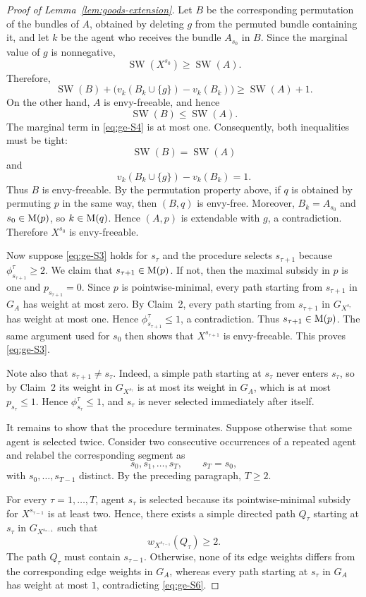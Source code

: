 \begin{proof}[Proof of Lemma~\ref{lem:goods-extension}]
Let $B$ be the corresponding permutation of the bundles of $A$, obtained by
deleting $g$ from the permuted bundle containing it, and let $k$ be the agent who
receives the bundle $A_{s_0}$ in $B$. Since the marginal value of $g$ is
nonnegative,
\[
  \operatorname{SW}(X^{s_0})\geq\operatorname{SW}(A).
\]
Therefore,
\begin{equation}\label{eq:ge-S4}
  \operatorname{SW}(B)
  +
  \bigl(v_k(B_k\cup\{g\})-v_k(B_k)\bigr)
  \geq
  \operatorname{SW}(A)+1.
\end{equation}
On the other hand, $A$ is envy-freeable, and hence
\[
  \operatorname{SW}(B)\leq\operatorname{SW}(A).
\]
The marginal term in \eqref{eq:ge-S4} is at most one. Consequently, both
inequalities must be tight:
\[
  \operatorname{SW}(B)=\operatorname{SW}(A)
\]
and
\[
  v_k(B_k\cup\{g\})-v_k(B_k)=1.
\]
Thus $B$ is envy-freeable. By the permutation property above, if $q$ is obtained
by permuting $p$ in the same way, then $(B,q)$ is envy-free. Moreover,
$B_k=A_{s_0}$ and $s_0\in \mathrm{M}(p)$, so $k\in \mathrm{M}(q)$. Hence $(A,p)$ is
extendable with $g$, a contradiction. Therefore $X^{s_0}$ is envy-freeable.

Now suppose \eqref{eq:ge-S3} holds for $s_\tau$ and the procedure selects
$s_{\tau+1}$ because $\phi^\tau_{s_{\tau+1}}\geq2$. We claim that
$s_{\tau+1}\in \mathrm{M}(p)$. If not, then the maximal subsidy in $p$ is one and
$p_{s_{\tau+1}}=0$. Since $p$ is pointwise-minimal, every path starting from
$s_{\tau+1}$ in $G_A$ has weight at most zero. By Claim~2, every path starting
from $s_{\tau+1}$ in $G_{X^{s_\tau}}$ has weight at most one. Hence
$\phi^\tau_{s_{\tau+1}}\leq1$, a contradiction. Thus $s_{\tau+1}\in \mathrm{M}(p)$.
The same argument used for $s_0$ then shows that $X^{s_{\tau+1}}$ is
envy-freeable. This proves \eqref{eq:ge-S3}.

Note also that $s_{\tau+1}\neq s_\tau$. Indeed, a simple path starting at
$s_\tau$ never enters $s_\tau$, so by Claim~2 its weight in $G_{X^{s_\tau}}$ is at
most its weight in $G_A$, which is at most $p_{s_\tau}\leq1$. Hence
$\phi^\tau_{s_\tau}\leq1$, and $s_\tau$ is never selected immediately after
itself.

It remains to show that the procedure terminates. Suppose otherwise that some
agent is selected twice. Consider two consecutive occurrences of a repeated agent
and relabel the corresponding segment as
\[
  s_0,s_1,\ldots,s_T,
  \qquad
  s_T=s_0,
\]
with $s_0,\ldots,s_{T-1}$ distinct. By the preceding paragraph, $T\geq2$.

For every $\tau=1,\ldots,T$, agent $s_\tau$ is selected because its
pointwise-minimal subsidy for $X^{s_{\tau-1}}$ is at least two. Hence, there
exists a simple directed path $Q_\tau$ starting at $s_\tau$ in
$G_{X^{s_{\tau-1}}}$ such that
\begin{equation}\label{eq:ge-S6}
  w_{X^{s_{\tau-1}}}(Q_\tau)\geq2.
\end{equation}
The path $Q_\tau$ must contain $s_{\tau-1}$. Otherwise, none of its edge weights
differs from the corresponding edge weights in $G_A$, whereas every path starting
at $s_\tau$ in $G_A$ has weight at most $1$, contradicting \eqref{eq:ge-S6}.


\end{proof}
